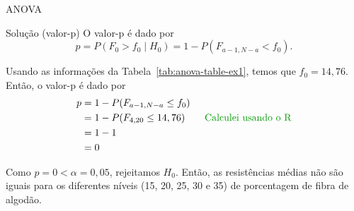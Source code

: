 \documentclass[8pt]{beamer}
\begin{document}
\begin{frame}{ANOVA}

\begin{block}{Solução (valor-p)}
	O valor-p é dado por
	$$p=P(F_0 > f_0 \mid H_0) = 1 - P(F_{a-1, N-a} < f_0).$$
	
	Usando as informações da Tabela~\ref{tab:anova-table-ex1}, temos que $f_0 = 14,76$. Então, o valor-p é dado por
	\begin{align*}
		p &= 1 - P(F_{a-1, N-a} \leq f_0)\\
		&= 1 - P(F_{4, 20} \leq 14,76)\qquad \textcolor{important}{\mbox{Calculei usando o R}}\\
		&= 1 - 1\\
		&=0
	\end{align*}
	
	Como $p=0 < \alpha = 0,05$, rejeitamos $H_0$. Então, as resistências médias não são iguais para os diferentes níveis (15, 20, 25, 30 e 35) de porcentagem de fibra de algodão.
\end{block}
\end{frame}
\end{document}
